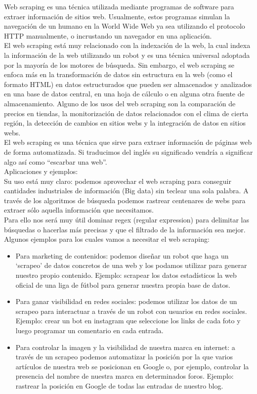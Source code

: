 \begin{itemize}
			Web scraping es una técnica utilizada mediante programas de software para extraer información de sitios web. Usualmente, estos programas simulan la navegación de un humano en la World Wide Web ya sea utilizando el protocolo HTTP manualmente, o incrustando un navegador en una aplicación.  \\
			El web scraping está muy relacionado con la indexación de la web, la cual indexa la información de la web utilizando un robot y es una técnica universal adoptada por la mayoría de los motores de búsqueda. Sin embargo, el web scraping se enfoca más en la transformación de datos sin estructura en la web (como el formato HTML) en datos estructurados que pueden ser almacenados y analizados en una base de datos central, en una hoja de cálculo o en alguna otra fuente de almacenamiento. Alguno de los usos del web scraping son la comparación de precios en tiendas, la monitorización de datos relacionados con el clima de cierta región, la detección de cambios en sitios webs y la integración de datos en sitios webs.	\cite{araña} \\
			
			El web scraping es una técnica que sirve para extraer información de páginas web de forma automatizada. Si traducimos del inglés su significado vendría a significar algo así como “escarbar una web”. \\
			Aplicaciones y ejemplos:\\
			Su uso está muy claro: podemos aprovechar el web scraping para conseguir cantidades industriales de información (Big data) sin teclear una sola palabra. A través de los algoritmos de búsqueda podemos rastrear centenares de webs para extraer sólo aquella información que necesitamos.\\
			Para ello nos será muy útil dominar regex (regular expression) para delimitar las búsquedas o hacerlas más precisas y que el filtrado de la información sea mejor.\\
			Algunos ejemplos para los cuales vamos a necesitar el web scraping:
			\begin{itemize}
				\item Para marketing de contenidos: podemos diseñar un robot que haga un ‘scrapeo’ de datos concretos de una web y los podamos utilizar para generar nuestro propio contenido. Ejemplo: scrapear los datos estadísticos la web oficial de una liga de fútbol para generar nuestra propia base de datos.
				\item Para ganar visibilidad en redes sociales: podemos utilizar los datos de un scrapeo para interactuar a través de un robot con usuarios en redes sociales. Ejemplo: crear un bot en instagram que seleccione los links de cada foto y luego programar un comentario en cada entrada.
				\item Para controlar la imagen y la visibilidad de nuestra marca en internet: a través de un scrapeo podemos automatizar la posición por la que varios artículos de nuestra web se posicionan en Google o, por ejemplo, controlar la presencia del nombre de nuestra marca en determinados foros. Ejemplo: rastrear la posición en Google de todas las entradas de nuestro blog.
			\end{itemize}	
			

\end{itemize}
